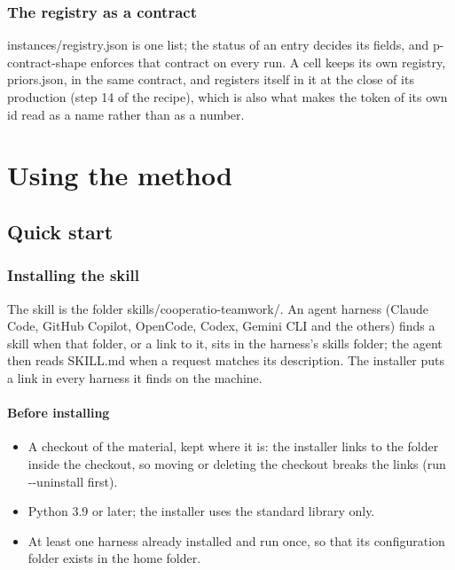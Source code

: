 \documentclass[
  american,
  10pt,
]{report}
\providecommand{\tightlist}{%
  \setlength{\itemsep}{0pt}\setlength{\parskip}{0pt}}
\renewcommand{\texttt}[1]{{\ttfamily\hyphenchar\font=-1 #1}}
\begin{document}
\section{The registry as a contract}\label{the-registry-as-a-contract}

\texttt{instances/\allowbreak{}registry.\allowbreak{}json} is one list;
the status of an entry decides its fields, and
\texttt{p-\allowbreak{}contract-\allowbreak{}shape} enforces that
contract on every run. A cell keeps its own registry,
\texttt{priors.\allowbreak{}json}, in the same contract, and registers
itself in it at the close of its production (step 14 of the recipe),
which is also what makes the token of its own id read as a name rather
than as a number.

\part{Using the method}

\chapter{Quick start}\label{quick-start}

\section{Installing the skill}\label{installing-the-skill}

The skill is the folder
\texttt{skills/\allowbreak{}cooperatio-\allowbreak{}teamwork/\allowbreak{}}.
An agent harness (Claude Code, GitHub Copilot, OpenCode, Codex, Gemini
CLI and the others) finds a skill when that folder, or a link to it,
sits in the harness's skills folder; the agent then reads
\texttt{SKILL.\allowbreak{}md} when a request matches its description.
The installer puts a link in every harness it finds on the machine.

\subsection{Before installing}\label{before-installing}

\begin{itemize}
\tightlist
\item
  A checkout of the material, kept where it is: the installer links to
  the folder inside the checkout, so moving or deleting the checkout
  breaks the links (run \texttt{-\allowbreak{}-\allowbreak{}uninstall}
  first).
\item
  Python 3.9 or later; the installer uses the standard library only.
\item
  At least one harness already installed and run once, so that its
  configuration folder exists in the home folder.
\end{itemize}
\end{document}
